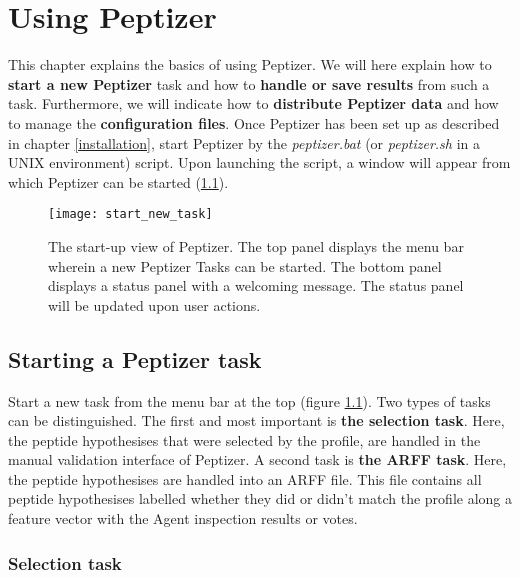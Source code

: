 \chapter{Using Peptizer}
%
%
\npar This chapter explains the basics of using Peptizer. We will here explain how to \textbf{start a new Peptizer} task and how to \textbf{handle or save results} from such a task. Furthermore, we will indicate how to \textbf{distribute Peptizer data} and how to manage the \textbf{configuration files}.
%
%
\npar Once Peptizer has been set up as described in chapter \ref{installation}, start Peptizer by the \textit{peptizer.bat} (or \textit{peptizer.sh} in a UNIX environment) script. Upon launching the script, a window will appear from which Peptizer can be started (\ref{start_new_task}).
%
\begin{figure}[t!]
\begin{center}
	\texttt{[image: start\_new\_task]}
	\caption{\label{start_new_task}The start-up view of Peptizer. The top panel displays the menu bar wherein a new Peptizer Tasks can be started. The bottom panel displays a status panel with a welcoming message. The status panel will be updated upon user actions.}
\end{center}
\end{figure}
%
\section{Starting a Peptizer task}
%
\npar Start a new task from the menu bar at the top (figure \ref{start_new_task}).
\npar Two types of tasks can be distinguished. The first and most important is \textbf{the selection task}. Here, the peptide hypothesises that were selected by the profile, are handled in the manual validation interface of Peptizer. A second task is \textbf{the ARFF task}. Here, the peptide hypothesises are handled into an ARFF file. This file contains all peptide hypothesises labelled whether they did or didn't match the profile along a feature vector with the Agent inspection results or votes.
%
%
\subsection{Selection task}
